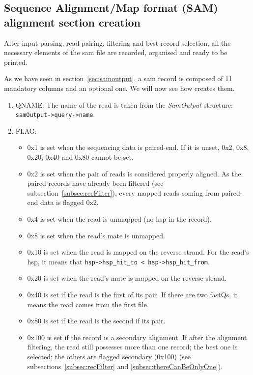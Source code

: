 \subsection{Sequence Alignment\slash Map format (SAM) alignment section creation}
\label{subsec:samCreation}
After input parsing, read pairing, filtering and best record selection, all the necessary elements of the \gls{sam} file are recorded, organised and ready to be printed.

As we have seen in section~\ref{sec:samoutput}, a \gls{sam} record is composed of 11 mandatory columns and an optional one.
We will now see how \blastobam{} creates them.
\begin{enumerate}
    \item QNAME: The name of the read is taken from the \emph{SamOutput} structure: \texttt{samOutput->\allowbreak query->\allowbreak name}.
    \item FLAG:
    \begin{itemize}
        \item 0x1 is set when the sequencing data is paired-end. If it is unset, 0x2, 0x8, 0x20, 0x40 and 0x80 cannot be set.
        \item 0x2 is set when the pair of reads is considered properly aligned.
        As the paired records have already been filtered (see subsection~\ref{subsec:recFilter}), every mapped reads coming from paired-end data is flagged 0x2.
        \item 0x4 is set when the read is unmapped (no \gls{hsp} in the record).
        \item 0x8 is set when the read's mate is unmapped.
        \item 0x10 is set when the read is mapped on the reverse strand. For the read's \gls{hsp}, it means that \texttt{hsp->\allowbreak hsp\_hit\_to < \allowbreak hsp->\allowbreak hsp\_hit\_from}.
        \item 0x20 is set when the read's mate is mapped on the reverse strand.
        \item 0x40 is set if the read is the first of its pair. If there are two fastQs, it means the read comes from the first file.
        \item 0x80 is set if the read is the second if its pair.
        \item 0x100 is set if the record is a secondary alignment.
        If after the alignment filtering, the read still possesses more than one record; the best one is selected; the others are flagged secondary (0x100)
        (see subsections~\ref{subsec:recFilter} and \ref{subsec:thereCanBeOnlyOne}).

\end{itemize}
\end{enumerate}
